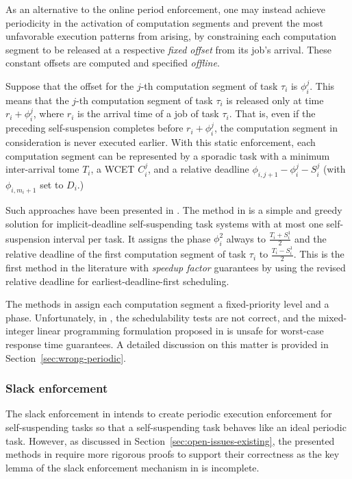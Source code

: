 As an alternative to the online period enforcement, one may instead achieve periodicity in the activation
of computation segments and prevent the most unfavorable execution patterns from arising, by constraining
each computation segment to be released at a respective \emph{fixed offset} from its job's arrival.
These constant offsets are computed and specified \emph{offline}.
 
Suppose that the offset for the $j$-th computation  segment of task $\tau_i$ is $\phi_i^j$. This means that the 
$j$-th computation segment of task $\tau_i$ is released only at time $r_i+\phi_i^j$, where $r_i$ is the arrival time of a job 
of task $\tau_i$. That is, even if the preceding self-suspension completes before $r_i+\phi_i^j$, the computation segment in
consideration is never executed earlier. With this static enforcement, each computation segment can be represented by a sporadic 
task with a minimum inter-arrival tome $T_i$, a WCET $C_i^j$, and a relative deadline $\phi_{i,j+1}-\phi_i^j-S_i^j$ (with 
$\phi_{i,m_i+1}$ set to $D_i$.) 

Such approaches have been presented in 
\cite{RTSS-KimANR13,LR:rtas10,RTSS-ChenL14}. The method in \cite{RTSS-ChenL14} is a simple and greedy solution for 
implicit-deadline self-suspending task systems with at most one self-suspension interval per task. It assigns the 
phase $\phi_i^2$ always to $\frac{T_i+S_i^1}{2}$ and the relative deadline of the first computation segment of task $\tau_i$ to 
$\frac{T_i-S_i^1}{2}$. This is the first method in the literature with \emph{speedup factor} guarantees by using the revised relative 
deadline for earliest-deadline-first scheduling. 

The methods in \cite{RTSS-KimANR13,DBLP:journals/ieicet/DingTT09} assign each computation segment a fixed-priority level and a phase. 
Unfortunately,  in \cite{RTSS-KimANR13,DBLP:journals/ieicet/DingTT09}, the schedulability tests are not correct, and the mixed-integer 
linear programming formulation proposed in \cite{RTSS-KimANR13} is unsafe for worst-case response time guarantees. 
A detailed discussion on this matter is 
provided in Section~\ref{sec:wrong-periodic}.

\subsubsection{Slack enforcement} 
\label{sec:slack-enforce}

The slack enforcement in \cite{LR:rtas10} intends to create periodic execution enforcement 
for self-suspending tasks so that a self-suspending task behaves like an ideal periodic task.  However, as discussed in 
Section~\ref{sec:open-issues-existing}, the presented methods in \cite{LR:rtas10} require more rigorous proofs to support 
their correctness as the key lemma of the slack enforcement mechanism in \cite{LR:rtas10} is incomplete.

